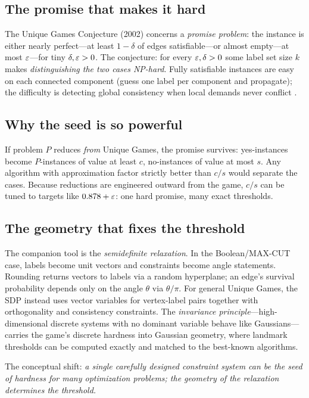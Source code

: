 \subsection{The promise that makes it hard}
The Unique Games Conjecture (2002) concerns a \emph{promise problem}: the instance is either nearly perfect---at least $1-\delta$ of edges satisfiable---or almost empty---at most $\varepsilon$---for tiny $\delta,\varepsilon>0$. The conjecture: for every $\varepsilon,\delta>0$ some label set size $k$ makes \emph{distinguishing the two cases NP-hard}. Fully satisfiable instances are easy on each connected component (guess one label per component and propagate); the difficulty is detecting global consistency when local demands never conflict \cite{khot-unique}.

\subsection{Why the seed is so powerful}
If problem $P$ reduces \emph{from} Unique Games, the promise survives: yes-instances become $P$-instances of value at least $c$, no-instances of value at most $s$. Any algorithm with approximation factor strictly better than $c/s$ would separate the cases. Because reductions are engineered outward from the game, $c/s$ can be tuned to targets like $0.878+\varepsilon$: one hard promise, many exact thresholds.

\subsection{The geometry that fixes the threshold}
The companion tool is the \emph{semidefinite relaxation}. In the Boolean/MAX-CUT case, labels become unit vectors and constraints become angle statements. Rounding returns vectors to labels via a random hyperplane; an edge's survival probability depends only on the angle $\theta$ via $\theta/\pi$. For general Unique Games, the SDP instead uses vector variables for vertex-label pairs together with orthogonality and consistency constraints. The \emph{invariance principle}---high-dimensional discrete systems with no dominant variable behave like Gaussians---carries the game's discrete hardness into Gaussian geometry, where landmark thresholds can be computed exactly and matched to the best-known algorithms.

The conceptual shift: \emph{a single carefully designed constraint system can be the seed of hardness for many optimization problems; the geometry of the relaxation determines the threshold.}

